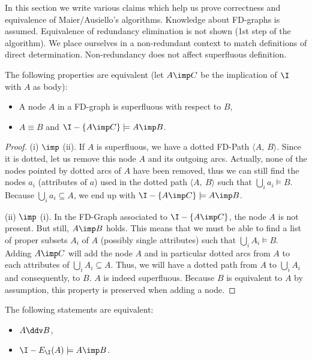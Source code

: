 In this section we write various claims which help us prove correctness and 
equivalence of Maier/Ausiello's algorithms. Knowledge about FD-graphs is 
assumed. Equivalence of redundancy elimination is not shown (1st step of 
the algorithm). We place ourselves in a non-redundant context to match
definitions of direct determination. Non-redundancy does not affect superfluous
definition.

\begin{proposition} \label{prop:maier.equiv_sup_sub} The following properties
are equivalent (let $A \imp C$ be the implication of $\I$ with $A$ as
body):
\begin{itemize}
	\item[(i)] A node $A$ in a FD-graph is superfluous with respect to $B$,
	\item[(ii)] $A \equiv B$ and $\I - \{A \imp C \} \models A \imp B$.
\end{itemize}
\end{proposition}

\begin{proof} (i) $\imp$ (ii). If $A$ is superfluous, we have a dotted FD-Path
$\langle A, \ B \rangle$. Since it is dotted, let us remove this node $A$ and
its outgoing arcs. Actually, none of the nodes pointed by dotted arcs of $A$
have been removed, thus we can still find the nodes $a_i$ (attributes of $a$) 
used in the dotted path $\langle A, \ B \rangle$ such that $\bigcup_i a_i 
\models B$. Because $\bigcup_i a_i \subseteq A$, we end up with $\I - \{A \imp 
C \} \models A \imp B$.

\vspace{1.2em}

(ii) $\imp$ (i). In the FD-Graph associated to $\I - \{A \imp C \}$, the node 
$A$ is not present. But still, $A \imp B$ holds. This means that we must be
able to find a list of proper subsets $A_i$ of $A$ (possibly single attributes)
such that $\bigcup_{i} A_i \models B$. Adding $A \imp C$ will add the node $A$
and in particular dotted arcs from $A$ to each attributes of $\bigcup_{i} A_i 
\subseteq A$. Thus, we will have a dotted path from $A$ to $\bigcup_{i} A_i$ and
consequently, to $B$. $A$ is indeed superfluous. Because $B$ is equivalent to 
$A$ by assumption, this property is preserved when adding a node.

\end{proof}

\begin{proposition} \label{prop:maier.equiv_dd_sub} The following statements 
are equivalent:
\begin{itemize}
	\item[(i)] $A\ddv B$,
	\item[(ii)] $\I - E_{\I}(A) \models A \imp B$.
\end{itemize}
	
\end{proposition}


